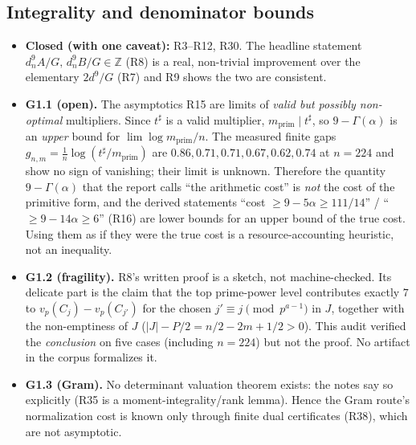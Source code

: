 \documentclass[11pt]{article}
\newcommand{\Z}{\mathbb{Z}}
\newcommand{\vp}{v_p}
\begin{document}
\subsection{Integrality and denominator bounds}
\begin{itemize}[leftmargin=1.4em]
\item \textbf{Closed (with one caveat):} R3--R12, R30. The headline statement
      $d_n^{9}A/G,\,d_n^{9}B/G\in\Z$ (R8) is a real, non-trivial improvement over the elementary
      $2d^{9}/G$ (R7) and R9 shows the two are consistent.
\item \textbf{G1.1 (open).} The asymptotics R15 are limits of \emph{valid but possibly non-optimal}
      multipliers. Since $t^{\sharp}$ is a valid multiplier, $m_{\mathrm{prim}}\mid t^{\sharp}$, so
      $9-\Gamma(\alpha)$ is an \emph{upper} bound for $\lim\log m_{\mathrm{prim}}/n$. The measured
      finite gaps $g_{n,m}=\frac1n\log(t^{\sharp}/m_{\mathrm{prim}})$ are $0.86,0.71,0.71,0.67,0.62,0.74$
      at $n=224$ and show no sign of vanishing; their limit is unknown. Therefore the quantity
      $9-\Gamma(\alpha)$ that the report calls ``the arithmetic cost'' is \emph{not} the cost of the
      primitive form, and the derived statements ``cost $\ge9-5\alpha\ge111/14$'' /
      ``$\ge9-14\alpha\ge6$'' (R16) are lower bounds for an upper bound of the true cost. Using them as
      if they were the true cost is a resource-accounting heuristic, not an inequality.
\item \textbf{G1.2 (fragility).} R8's written proof is a sketch, not machine-checked. Its delicate part
      is the claim that the top prime-power level contributes exactly $7$ to $\vp(C_j)-\vp(C_{j'})$
      for the chosen $j'\equiv j \pmod{p^{a-1}}$ in $J$, together with the non-emptiness of $J$
      ($|J|-P/2=n/2-2m+1/2>0$). This audit verified the \emph{conclusion} on five cases
      (including $n=224$) but not the proof. No artifact in the corpus formalizes it.
\item \textbf{G1.3 (Gram).} No determinant valuation theorem exists: the notes say so explicitly
      (R35 is a moment-integrality/rank lemma). Hence the Gram route's normalization cost is known
      only through finite dual certificates (R38), which are not asymptotic.
\end{itemize}
\end{document}
